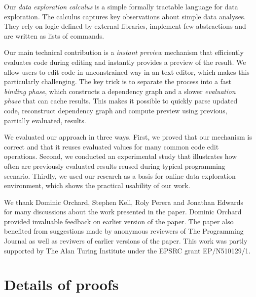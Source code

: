 \documentclass[english,crc,references=cleveref]{programming}
\theoremstyle{plain}
\theoremstyle{definition}
\begin{document}
Our \emph{data exploration calculus} is a simple formally tractable language
for data exploration. The calculus captures key observations about simple data analyses. They
rely on logic defined by external libraries, implement few abstractions and are written as lists of
commands.

Our main technical contribution is a \emph{instant preview} mechanism that efficiently evaluates
code during editing and instantly provides a preview of the result. We allow users to edit code
in unconstrained way in an text editor, which makes this particularly challenging. The key trick
is to separate the process into a fast \emph{binding phase}, which constructs a dependency graph
and a slower \emph{evaluation phase} that can cache results. This makes it possible to quickly parse
updated code, reconstruct dependency graph and compute preview using previous, partially
evaluated, results.

We evaluated our approach in three ways. First, we proved that our mechanism is correct and
that it reuses evaluated values for many common code edit operations. Second, we conducted an
experimental study that illustrates how often are previously evaluated results reused during
typical programming scenario. Thirdly, we used our research as a basis for online data exploration
environment, which shows the practical usability of our work.

\acks
\begin{sloppypar}
 We thank Dominic Orchard, Stephen Kell, Roly Perera and Jonathan
  Edwards for many discussions about the work presented in the paper. Dominic
  Orchard provided invaluable feedback on earlier version of the paper. The
  paper also benefited from suggestions made by anonymous reviewers of The
  Programming Journal as well as reviwers of earlier versions of the paper.
  This work was partly supported by The Alan Turing Institute under the EPSRC
  grant EP/N510129/1.
\end{sloppypar}

\printbibliography


\appendix

\section{Details of proofs}
\end{document}

